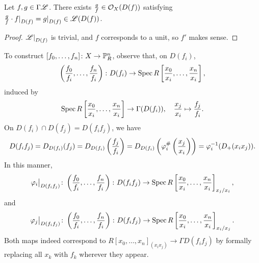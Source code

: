 \newpage
\begin{corollary} \label{cor:agreement_of_sections}
    Let $f, g \in \Gamma \mathscr L$. There exists $\frac{g}{f} \in \mathcal O_X(D(f))$ satisfying $\frac{g}{f} \cdot \restr{f}{D(f)} = \restr{g}{D(f)} \in \SCL(D(f))$.
\end{corollary}
\begin{proof}
    $\restr{\SCL}{D(f)}$ is trivial, and $f$ corresponds to a unit, so $f'$ makes sense.
\end{proof}
To construct $[f_0, \dots, f_n] \colon X \to \mathbb P_R^n$, observe that, on $D(f_i)$,
\[ \left(\frac{f_0}{f_i}, \dots, \frac{f_n}{f_i}\right) \colon D(f_i) \to \operatorname{Spec} R\left[\frac{x_0}{x_i}, \dots, \frac{x_n}{x_i}\right], \]
induced by
\[ \operatorname{Spec} R\left[\frac{x_0}{x_i}, \dots, \frac{x_n}{x_i}\right] \to \Gamma(D(f_i)), \quad \frac{x_j}{x_i} \mapsto \frac{f_j}{f_i}. \]
On $D(f_i) \cap D(f_j) = D(f_i f_j)$, we have 
\[ D(f_i f_j) = D_{D(f_i)}(f_j) = D_{D(f_i)}\left(\frac{f_j}{f_i}\right) = D_{D(f_i)}\left(\varphi_i^\#\left(\frac{x_j}{x_i}\right)\right) = \varphi_i^{-1}(D_+(x_i x_j)). \]
In this manner,
\[ \restr{\varphi_i}{D(f_i f_j)} \colon \left(\frac{f_0}{f_i}, \dots, \frac{f_n}{f_i}\right) \colon D(f_i f_j) \to \Spec R\left[\frac{x_0}{x_i}, \dots, \frac{x_n}{x_i}\right]_{x_j/x_i}, \]
and
\[ \restr{\varphi_j}{D(f_i f_j)} \colon \left(\frac{f_0}{f_i}, \dots, \frac{f_n}{f_i}\right) \colon D(f_i f_j) \to \Spec R\left[\frac{x_0}{x_i}, \dots, \frac{x_n}{x_i}\right]_{x_i/x_j}. \]
Both maps indeed correspond to $R[x_0, \dots, x_n]_{(x_i x_j)} \to \Gamma D(f_i f_j)$ by formally replacing all $x_k$ with $f_k$ wherever they appear.